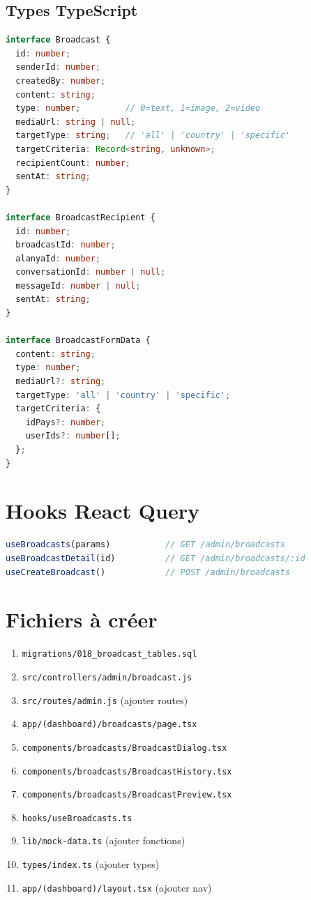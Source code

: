 \documentclass{article}
\begin{document}
\subsection{Types TypeScript}
\begin{lstlisting}[language=TypeScript]
interface Broadcast {
  id: number;
  senderId: number;
  createdBy: number;
  content: string;
  type: number;         // 0=text, 1=image, 2=video
  mediaUrl: string | null;
  targetType: string;   // 'all' | 'country' | 'specific'
  targetCriteria: Record<string, unknown>;
  recipientCount: number;
  sentAt: string;
}

interface BroadcastRecipient {
  id: number;
  broadcastId: number;
  alanyaId: number;
  conversationId: number | null;
  messageId: number | null;
  sentAt: string;
}

interface BroadcastFormData {
  content: string;
  type: number;
  mediaUrl?: string;
  targetType: 'all' | 'country' | 'specific';
  targetCriteria: {
    idPays?: number;
    userIds?: number[];
  };
}
\end{lstlisting}

\section{Hooks React Query}
\begin{lstlisting}[language=TypeScript]
useBroadcasts(params)           // GET /admin/broadcasts
useBroadcastDetail(id)          // GET /admin/broadcasts/:id
useCreateBroadcast()            // POST /admin/broadcasts
\end{lstlisting}

\section{Fichiers à créer}
\begin{enumerate}
    \item \texttt{migrations/018\_broadcast\_tables.sql}
    \item \texttt{src/controllers/admin/broadcast.js}
    \item \texttt{src/routes/admin.js} (ajouter routes)
    \item \texttt{app/(dashboard)/broadcasts/page.tsx}
    \item \texttt{components/broadcasts/BroadcastDialog.tsx}
    \item \texttt{components/broadcasts/BroadcastHistory.tsx}
    \item \texttt{components/broadcasts/BroadcastPreview.tsx}
    \item \texttt{hooks/useBroadcasts.ts}
    \item \texttt{lib/mock-data.ts} (ajouter fonctions)
    \item \texttt{types/index.ts} (ajouter types)
    \item \texttt{app/(dashboard)/layout.tsx} (ajouter nav)
\end{enumerate}
\end{document}

